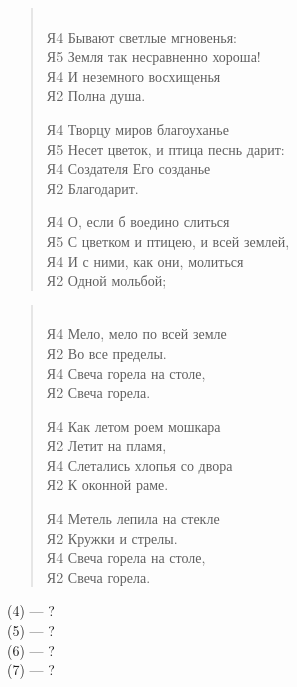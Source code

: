 \documentclass{beamer}
\begin{document}
\begin{frame}

\begin{verse}
\\
Я4 Бывают светлые мгновенья:\\
Я5 Земля так несравненно хороша!\\
Я4 И неземного восхищенья\\
Я2 Полна душа.

Я4 Творцу миров благоуханье	\\
Я5 Несет цветок, и птица песнь дарит:	\\
Я4 Создателя Его созданье\\
Я2 Благодарит.

Я4 О, если б воедино слиться\\
Я5 С цветком и птицею, и всей землей,\\
Я4 И с ними, как они, молиться\\
Я2 Одной мольбой;

\end{verse}

\end{frame}
%
%
\begin{frame}

\begin{verse}
\\
Я4 Мело, мело по всей земле	\\
Я2 Во все пределы.\\
Я4 Свеча горела на столе,\\
Я2 Свеча горела.	

Я4 Как летом роем мошкара\\
Я2 Летит на пламя,	\\
Я4 Слетались хлопья со двора\\
Я2 К оконной раме.

Я4 Метель лепила на стекле\\
Я2 Кружки и стрелы.	\\
Я4 Свеча горела на столе,\\
Я2 Свеча горела.	
\end{verse}
\end{frame}


\begin{frame}

\begin{center}
{\LARGE (4) — ?} \\
{\LARGE (5) — ?} \\
{\LARGE (6) — ?} \\
{\LARGE (7) — ?} 
\end{center}

\end{frame}
\end{document}

